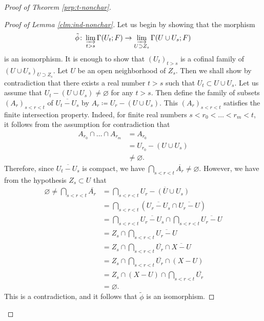 \begin{proof}[{Proof of Theorem \ref{prp:t-nonchar}}]
\begin{proof}[Proof of Lemma \ref{clm:ind-nonchar}]
    Let us begin by showing that the morphism  
    \[
      \tilde{\phi}\colon\indlim[t>s]
      \Gamma(U_{t};F)
      \to 
      \indlim[U\supset Z_{s}]
      \Gamma(U\cup U_{s};F) 
    \]
    is an isomorphism. 
    It is enough to show that \(
      \left(U_{t}\right)_{t>s}
    \) is a cofinal family of \((U\cup U_{s})_{U\supset Z_{s}}\). 
    Let \(U\) be an open neighborhood of \(Z_{s}\). 
    Then we shall show by contradiction that 
    there exists a real number \(t>s\) such that 
    \(U_{t}\subset U\cup U_{s}\). 
    Let us assume that 
    \(U_{t}-(U\cup U_{s})\ne \varnothing\) 
    for any \(t>s\). 
    Then define the family of subsets \(
      \left(A_{r}\right)_{s<r<t}
    \) of \(\overline{U_{t}- U_{s}}\) by \(
      A_{r}\coloneqq U_{r}- (U\cup U_{s})
    \). 
    This \(\left(A_{r}\right)_{s<r<t}\) satisfies 
    the finite intersection property. 
    Indeed, for finite real numbers \(s<r_{0}<\dots<r_{m}<t\), 
    it follows from 
    the assumption for contradiction
    that
    \begin{align*}
      A_{r_{0}}\cap \dots \cap A_{r_{m}}
      &= A_{r_{0}}\\
      &= U_{r_{0}}- (U\cup U_{s})\\
      &\ne \varnothing.
    \end{align*}
    Therefore, since \(\overline{U_{t}- U_{s}}\) is 
    compact, we have \(\bigcap_{s<r<t}\overline{A_{r}}\ne\varnothing\). 
    However, 
    we have from the hypothesis \(Z_{s}\subset U\) that 
    \begin{align*}
      \varnothing 
      \ne
      \bigcap_{s<r<t}\overline{A_{r}}
      &=\bigcap_{s<r<t}\overline{U_{r}-(U\cup U_{s})}\\
      &=\bigcap_{s<r<t}(\overline{U_{r}- U_{s}}\cap \overline{U_{r} - U})\\
      &=\bigcap_{s<r<t}\overline{U_{r}- U_{s}}\cap \bigcap_{s<r<t}\overline{U_{r} - U}\\
      &=Z_{s}\cap \bigcap_{s<r<t}\overline{U_{r} - U}\\
      &=Z_{s}\cap \bigcap_{s<r<t}\overline{U_{r}}\cap \overline{X- U}\\
      &=Z_{s}\cap \bigcap_{s<r<t}\overline{U_{r}}\cap (X- U)\\
      &=Z_{s}\cap (X- U)\cap \bigcap_{s<r<t}\overline{U_{r}}\\
      &=\varnothing. 
    \end{align*}
    This is a contradiction, 
    and it follows that \(\tilde{\phi}\) is an isomorphism. 


\end{proof}
\end{proof}
